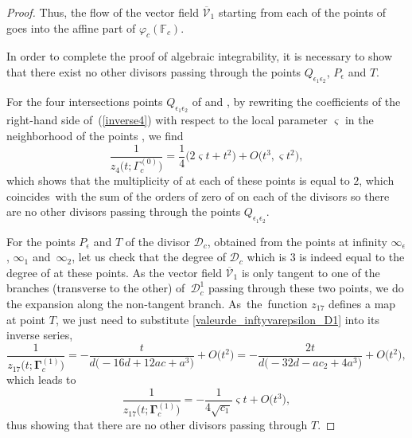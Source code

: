 \documentclass[10pt,a4paper]{amsart}
\numberwithin{equation}{section}
\begin{document}
\begin{proof}
 Thus, the flow of the vector field $\overline{\mathcal{V}}_1$
 starting from each of the points of  goes into the affine part of $\varphi_c(\mathbb{ F}_c)$.

 In order to complete the proof of algebraic integrability, it is necessary to show that there exist no other divisors passing through the points $Q_{\epsilon_1\epsilon_2}$, $P_{\epsilon}$ and $T$.

 For the four intersections points $Q_{\epsilon_1\epsilon_2}$ of  and
 , by rewriting the coefficients of the right-hand side of~(\ref{inverse4}) with respect to the local parameter $\varsigma$ in the neighborhood of the points , we find
 \[
 \frac{1}{z_4\bigl(t;\Gamma^{(0)}_c\bigr)}=\frac{1}{4}\bigl(2\varsigma t+t^ 2\bigr)+O\bigl(t^3,\varsigma t^2\bigr),
 \]
 which shows that the multiplicity of  at each of these points is equal to $2$, which coincides~with the sum of the orders of zero of  on each of the divisors so there are no other divisors passing through the points $Q_{\epsilon_1\epsilon_2}$.

 For the points $P_{\epsilon}$ and $T$ of the divisor $\mathcal{D}_c$, obtained from the points at infinity $\infty_{\epsilon}$, $\infty_{1}$ and~$\infty_{2}$, let us check that the degree of $\mathcal{D}_c$ which is $3$ is indeed equal to the degree of  at these points. As the vector field $\overline{\mathcal{V}}_1$ is only tangent to one of the branches (transverse to the other) of~$\mathcal{D}_c^{1}$ passing through these two points, we do the expansion along the non-tangent branch. As~the~function $z_{17}$ defines a map at point $T$, we just need to substitute \eqref{valeurde_inftyvarepsilon_D1}
 into its inverse series,
 \[
 \frac{1}{z_{17}\bigl(t;\mathbf{\Gamma}_c^{(1)}\bigr)}=-\frac{t}{d\bigl(-16d+12ac+a^3\bigr)}+ O\bigl(t^2\bigr)=-\frac{2t}{d\bigl(-32d-ac_2+4a^3\bigr)}+ O\bigl(t^2\bigr),
 \]
 which leads to
 \[
 \frac{1}{z_{17}\bigl(t;\mathbf{\Gamma}_c^{(1)}\bigr)}=-\frac{1}{ 4\sqrt{c_1}}\varsigma t+ O\bigl(t^3\bigr),
 \]
 thus showing that there are no other divisors passing through $T$.


\end{proof}
\end{document}
